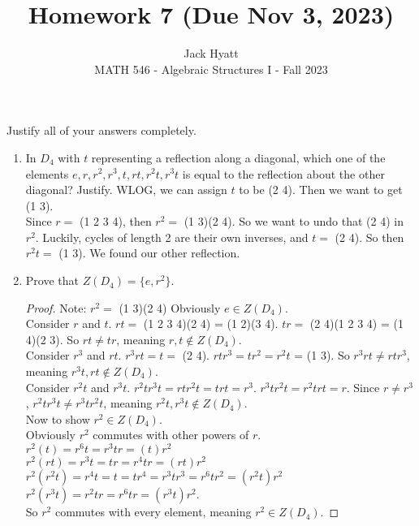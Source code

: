 \documentclass[12pt]{article}
\begin{document}
	
	
	
	\title{Homework 7 (Due Nov 3, 2023)}
	\author{Jack Hyatt\\ %
		MATH 546 - Algebraic Structures I - Fall 2023} 
	
	\maketitle
	
	Justify all of your answers completely.\\
	
	
	\medskip 
	
	\begin{enumerate}
		\item In $D_4$ with $t$ representing a reflection along a diagonal, which one of the elements $e, r, r^2, r^3, t, rt, r^2t, r^3t$ is equal to the reflection about the other diagonal? Justify.\m
		WLOG, we can assign $t$ to be (2 4). Then we want to get (1 3).\\
		Since $r =$ (1 2 3 4), then $r^2 =$ (1 3)(2 4). So we want to undo that (2 4) in $r^2$. Luckily, cycles of length 2 are their own inverses, and $t =$ (2 4). So then $r^2t =$ (1 3). We found our other reflection.
		
		\item Prove that $Z(D_4) = \{e, r^2\}$.
		\begin{proof}
			Note: $r^2 =$ (1 3)(2 4)
			Obviously $e \in Z(D_4)$.\\
			Consider $r$ and $t$. $rt =$ (1 2 3 4)(2 4) = (1 2)(3 4). $tr =$ (2 4)(1 2 3 4) = (1 4)(2 3). So $rt \neq tr$, meaning $r,t \nin Z(D_4)$.\\
			Consider $r^3$ and $rt$. $r^3rt = t =$ (2 4). $rtr^3 = tr^2 = r^2t$ = (1 3). So $r^3rt \neq rtr^3$, meaning $r^3t,rt \nin Z(D_4)$.\\
			Consider $r^2t$ and $r^3t$. $r^2tr^3t = rtr^2t = trt = r^3$. $r^3tr^2t = r^2trt = r$. Since $r \neq r^3$, $r^2tr^3t \neq r^3tr^2t$, meaning $r^2t,r^3t \nin Z(D_4)$.\\
			Now to show $r^2 \in Z(D_4)$.\\
			Obviously $r^2$ commutes with other powers of $r$.\\
			$r^2(t) = r^6t = r^3tr = (t)r^2$\\
			$r^2(rt) = r^3t = tr = r^4tr =(rt)r^2$\\
			$r^2(r^2t) = r^4t = t = tr^4 = r^3tr^3 = r^6tr^2 = (r^2t)r^2$\\
			$r^2(r^3t) = r^2tr = r^6tr = (r^3t)r^2$.\\
			So $r^2$ commutes with every element, meaning $r^2 \in Z(D_4)$.			
		\end{proof}
		

\end{enumerate}
\end{document}
